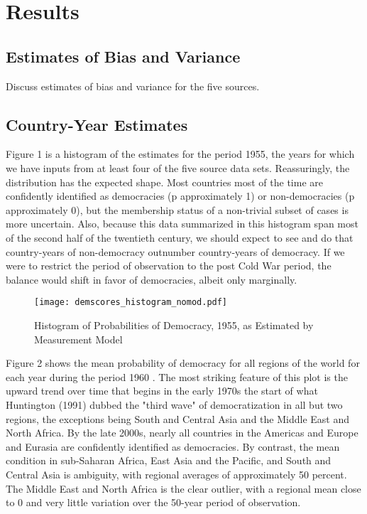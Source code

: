 \documentclass[letterpaper]{article}
\begin{document}
\section{Results}

\subsection{Estimates of Bias and Variance}

Discuss estimates of bias and variance for the five sources.

\subsection{Country-Year Estimates}

Figure 1 is a histogram of the estimates for the period 1955, the years for which we have inputs from at least four of the five source data sets. Reassuringly, the distribution has the expected shape. Most countries most of the time are confidently identified as democracies (p approximately 1) or non-democracies (p approximately 0), but the membership status of a non-trivial subset of cases is more uncertain. Also, because this data summarized in this histogram span most of the second half of the twentieth century, we should expect to see \textemdash and do \textemdash that country-years of non-democracy outnumber country-years of democracy. If we were to restrict the period of observation to the post \textendash Cold War period, the balance would shift in favor of democracies, albeit only marginally. 

\begin{figure}
    \centering
    \texttt{[image: demscores\_histogram\_nomod.pdf]}
    \caption{Histogram of Probabilities of Democracy, 1955, as Estimated by Measurement Model}
    \label{fig:histogram}
\end{figure}

Figure 2 shows the mean probability of democracy for all regions of the world for each year during the period 1960 . The most striking feature of this plot is the upward trend over time that begins in the early 1970s \textemdash the start of what Huntington (1991) \cite{huntington} dubbed the "third wave" of democratization \textemdash in all but two regions, the exceptions being South and Central Asia and the Middle East and North Africa. By the late 2000s, nearly all countries in the Americas and Europe and Eurasia are confidently identified as democracies. By contrast, the mean condition in sub-Saharan Africa, East Asia and the Pacific, and South and Central Asia is ambiguity, with regional averages of approximately 50 percent. The Middle East and North Africa is the clear outlier, with a regional mean close to 0 and very little variation over the 50-year period of observation.
\end{document}
